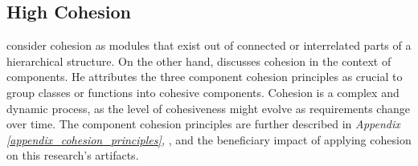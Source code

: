 \subsection{High Cohesion} \label{subsubsec_on_cohesion}

\textcite[22]{mannaert_normalized_2016} consider cohesion as modules that exist out of
connected or interrelated parts of a hierarchical structure. On the other hand,
\textcite[118]{robert_c_martin_clean_2018} discusses cohesion in the context of
components. He attributes the three component cohesion principles as crucial to group
classes or functions into cohesive components. Cohesion is a complex and dynamic process,
as the level of cohesiveness might evolve as requirements change over time. The component
cohesion principles are further described in \textit{Appendix
\ref{appendix_cohesion_principles}, }, and the
beneficiary impact of applying cohesion on this research’s artifacts.